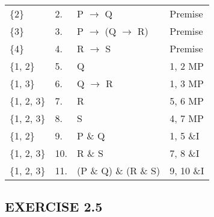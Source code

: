 \documentclass[a4paper,12pt]{article}
\newcommand{\mra}{$\rightarrow$ }
\begin{document}
\begin{enumerate}[label=\arabic*,leftmargin=*]
\begin{enumerate}[label=(\roman*)]
\begin{minipage}{\textwidth}
\begin{tabular}{l l l l}
                        \{2\} & 2. & P \mra Q & Premise\\
                        \{3\} & 3. & P \mra (Q \mra R) & Premise\\
                        \{4\} & 4. & R \mra S & Premise\\
                        \{1, 2\} & 5. & Q & 1, 2 MP\\
                        \{1, 3\} & 6. & Q \mra R & 1, 3 MP\\
                        \{1, 2, 3\} & 7. & R & 5, 6 MP\\
                        \{1, 2, 3\} & 8. & S & 4, 7 MP\\
                        \{1, 2\} & 9. & P \& Q & 1, 5 \&I\\
                        \{1, 2, 3\} & 10. & R \& S & 7, 8 \&I\\
                        \{1, 2, 3\} & 11. & (P \& Q) \& (R \& S) & 9, 10 \&I\\
                    \end{tabular}
                \end{minipage}

            \end{enumerate}

    \end{enumerate}

    \subsection*{EXERCISE 2.5}
\end{document}
